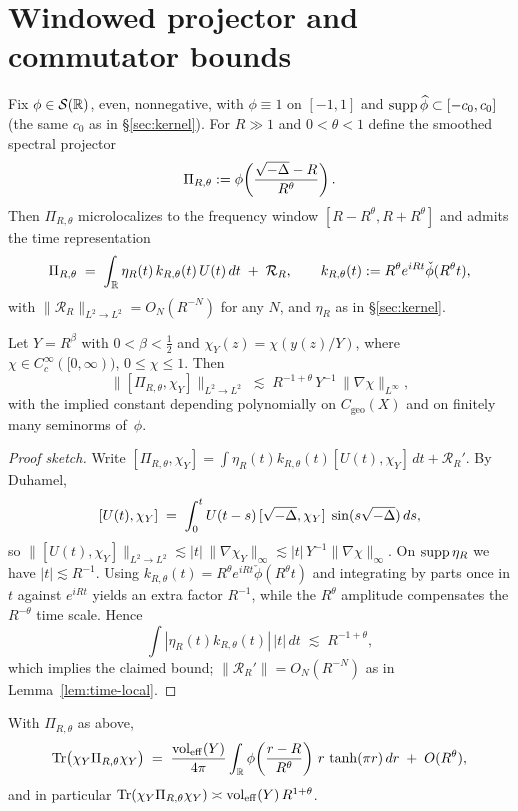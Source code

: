 \section{Windowed projector and commutator bounds}\label{sec:projector}

Fix $\phi\in\mathcal{S}(\mathbb{R})$, even, nonnegative, with $\phi\equiv1$ on $[-1,1]$
and $\operatorname{supp} \widehat{\phi}\subset[-c_0,c_0]$ (the same $c_0$ as in
\S\ref{sec:kernel}). For $R\gg1$ and $0<\theta<1$ define the smoothed
spectral projector
\[
  \Pi_{R,\theta}:=\phi\!\left(\frac{\sqrt{-\Delta}-R}{R^\theta}\right).
\]
Then $\Pi_{R,\theta}$ microlocalizes to the frequency window
$[R-R^\theta,R+R^\theta]$ and admits the time representation
\[
  \Pi_{R,\theta}
  \;=\; \int_{\mathbb{R}}\eta_R(t)\, k_{R,\theta}(t)\, U(t)\,dt \;+\; \mathcal{R}_R,
  \qquad
  k_{R,\theta}(t):=R^\theta e^{iRt}\check{\phi}(R^\theta t),
\]
with $\|\mathcal{R}_R\|_{L^2\to L^2}=O_N(R^{-N})$ for any $N$, and $\eta_R$ as
in \S\ref{sec:kernel}.

\begin{lemma}\label{lem:comm}
Let $Y=R^\beta$ with $0<\beta<\tfrac12$ and $\chi_Y(z)=\chi(y(z)/Y)$, where
$\chi\in C_c^\infty([0,\infty))$, $0\le \chi\le1$. Then
\[
  \big\|[\Pi_{R,\theta},\chi_Y]\big\|_{L^2\to L^2}
  \;\lesssim\; R^{-1+\theta}\,Y^{-1}\,\|\nabla\chi\|_{L^\infty},
\]
with the implied constant depending polynomially on $C_{\mathrm{geo}}(X)$ and on
finitely many seminorms of~$\phi$.
\end{lemma}

\begin{proof}[Proof sketch]
Write $[\Pi_{R,\theta},\chi_Y]=\int \eta_R(t)k_{R,\theta}(t)[U(t),\chi_Y]\,dt+\mathcal{R}_R'$.
By Duhamel,
\[
  [U(t),\chi_Y]
  \;=\; \int_0^t U(t-s)\,[\sqrt{-\Delta},\chi_Y]\;\sin(s\sqrt{-\Delta})\,ds,
\]
so $\|[U(t),\chi_Y]\|_{L^2\to L^2}\lesssim |t|\,\|\nabla\chi_Y\|_\infty
\lesssim |t|\,Y^{-1}\|\nabla\chi\|_\infty$. On $\operatorname{supp}\eta_R$ we have
$|t|\lesssim R^{-1}$. Using $k_{R,\theta}(t)=R^\theta e^{iRt}\check\phi(R^\theta t)$
and integrating by parts once in $t$ against $e^{iRt}$ yields an extra factor $R^{-1}$,
while the $R^\theta$ amplitude compensates the $R^{-\theta}$ time scale.
Hence
\[
  \int | \eta_R(t) k_{R,\theta}(t)|\,|t|\,dt \;\lesssim\; R^{-1+\theta},
\]
which implies the claimed bound; $\|\mathcal{R}_R'\|=O_N(R^{-N})$ as in
Lemma~\ref{lem:time-local}.
\end{proof}

\begin{lemma}\label{lem:rank}
With $\Pi_{R,\theta}$ as above,
\[
  \mathrm{Tr}\big(\chi_Y \Pi_{R,\theta}\chi_Y\big)
  \;=\; \frac{\operatorname{vol}_{\mathrm{eff}}(Y)}{4\pi}
  \int_{\mathbb{R}}\phi\!\left(\frac{r-R}{R^\theta}\right)\, r\,\tanh(\pi r)\,dr
  \;+\; O(R^{\theta}),
\]
and in particular $\mathrm{Tr}(\chi_Y \Pi_{R,\theta}\chi_Y) \asymp \operatorname{vol}_{\mathrm{eff}}(Y)\,R^{1+\theta}$.
\end{lemma}

